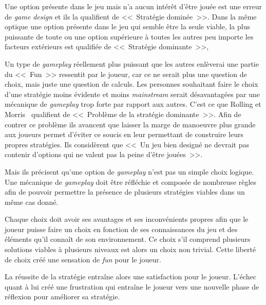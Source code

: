 Une option présente dans le jeu mais n'a aucun intérêt d'être jouée est une erreur de \emph{game design} et ils la qualifient de <<~Stratégie dominée~>>.
Dans la même optique une option présente dans le jeu qui semble être la seule viable, la plus puissante de toute ou une option supérieure à toutes les autres peu importe les facteurs extérieurs est qualifiée de <<~Stratégie dominante~>>,

Un type de \emph{gameplay} réellement plus puissant que les autres enlèverai une partie du <<~Fun~>> ressentit par le joueur, car ce ne serait plus une question de choix, mais juste une question de calculs.
Les personnes souhaitant faire le choix d'une stratégie moins évidente et moins \emph{mainstream} serait désavantagées par une mécanique de \emph{gameplay} trop forte par rapport aux autres.
C'est ce que Rolling et Morris~\cite{Rollings2004} qualifient de <<~Problème de la stratégie dominante~>>. 
Afin de contrer ce problème ils avancent que laisser la marge de manoeuvre plus grande aux joueurs permet d'éviter ce soucis en leur permettant de construire leurs propres stratégies.
Ils considèrent que <<~Un jeu bien designé ne devrait pas contenir d'options qui ne valent pas la peine d'être jouées~>>.

Mais ils précisent qu'une option de \emph{gameplay} n'est pas un simple choix logique.
Une mécanique de \emph{gameplay} doit être réfléchie et composée de nombreuse règles afin de pouvoir permettre la présence de plusieurs stratégies viables dans un même cas donné.

Chaque choix doit avoir ses avantages et ses inconvénients propres afin que le joueur puisse faire un choix en fonction de ses connaissances du jeu et des éléments qu'il connaît de son environnement.
Ce choix s'il comprend plusieurs solutions viables à plusieurs niveaux est alors un choix non trivial.
Cette liberté de choix créé une sensation de \emph{fun} pour le joueur.

La réussite de la stratégie entraîne alors une satisfaction pour le joueur.
L'échec quant à lui créé une frustration qui entraîne le joueur vers une nouvelle phase de réflexion pour améliorer sa stratégie.




